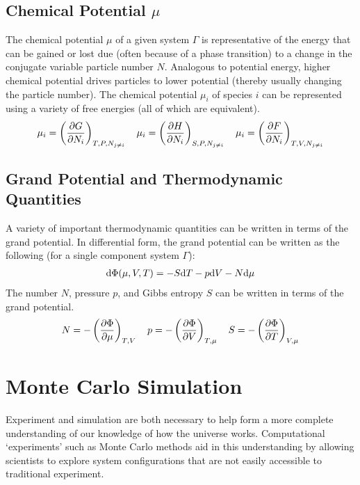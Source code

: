 \subsection{Chemical Potential $\mu$}
The chemical potential $\mu$ of a given system $\Gamma$ is representative of the energy that can be gained or lost due (often because of a phase transition) to a change in the conjugate variable particle number $N$. Analogous to potential energy, higher chemical potential drives particles to lower potential (thereby usually changing the particle number). The chemical potential $\mu_i$ of species $i$ can be represented using a variety of free energies (all of which are equivalent).
\begin{align}
    \mu_i = \left( \pdv{G}{N_i}\right )_{T,P,N_{j \neq i}}  \quad
    \mu_i = \left( \pdv{H}{N_i}\right )_{S,P,N_{j \neq i}}  \quad
    \mu_i = \left( \pdv{F}{N_i}\right )_{T,V,N_{j \neq i}}  
\end{align}

\subsection{Grand Potential and Thermodynamic Quantities}
A variety of important thermodynamic quantities can be written in terms of the grand potential. In differential form, the grand potential can be written as the following (for a single component system $\Gamma$):
\begin{align}
    \text{d}\Phi(\mu,V,T) = -S\text{d}T-p\text{d}V-N\text{d}\mu
\end{align}
The number $N$, pressure $p$, and Gibbs entropy $S$ can be written in terms of the grand potential.
\begin{align}
    N = -\left( \pdv{\Phi}{\mu}\right )_{T,V}  \quad
    p = -\left( \pdv{\Phi}{V}\right )_{T,\mu}  \quad
    S = -\left( \pdv{\Phi}{T}\right )_{V, \mu} 
\end{align}


\section{Monte Carlo Simulation}\label{monte}
Experiment and simulation are both necessary to help form a more complete
understanding of our knowledge of how the universe works. Computational
`experiments' such as Monte Carlo methods aid in this understanding by allowing
scientists to explore system configurations that are not easily accessible to
traditional experiment.

